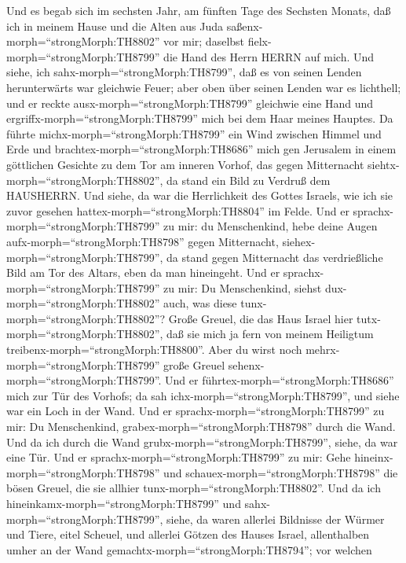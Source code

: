  Und es begab sich im sechsten Jahr, am fünften Tage des
Sechsten Monats, daß ich in meinem Hause und die Alten aus Juda
saßenx-morph=``strongMorph:TH8802'' vor mir; daselbst
fielx-morph=``strongMorph:TH8799'' die Hand des Herrn HERRN auf mich.
 Und siehe, ich sahx-morph=``strongMorph:TH8799'', daß es
von seinen Lenden herunterwärts war gleichwie Feuer; aber oben über
seinen Lenden war es lichthell;  und er reckte
ausx-morph=``strongMorph:TH8799'' gleichwie eine Hand und
ergriffx-morph=``strongMorph:TH8799'' mich bei dem Haar meines Hauptes.
Da führte michx-morph=``strongMorph:TH8799'' ein Wind zwischen Himmel
und Erde und brachtex-morph=``strongMorph:TH8686'' mich gen Jerusalem in
einem göttlichen Gesichte zu dem Tor am inneren Vorhof, das gegen
Mitternacht siehtx-morph=``strongMorph:TH8802'', da stand ein Bild zu
Verdruß dem HAUSHERRN.  Und siehe, da war die Herrlichkeit
des Gottes Israels, wie ich sie zuvor gesehen
hattex-morph=``strongMorph:TH8804'' im Felde.  Und er
sprachx-morph=``strongMorph:TH8799'' zu mir: du Menschenkind, hebe deine
Augen aufx-morph=``strongMorph:TH8798'' gegen Mitternacht,
siehex-morph=``strongMorph:TH8799'', da stand gegen Mitternacht das
verdrießliche Bild am Tor des Altars, eben da man hineingeht.
 Und er sprachx-morph=``strongMorph:TH8799'' zu mir: Du
Menschenkind, siehst dux-morph=``strongMorph:TH8802'' auch, was diese
tunx-morph=``strongMorph:TH8802''? Große Greuel, die das Haus Israel
hier tutx-morph=``strongMorph:TH8802'', daß sie mich ja fern von meinem
Heiligtum treibenx-morph=``strongMorph:TH8800''. Aber du wirst noch
mehrx-morph=``strongMorph:TH8799'' große Greuel
sehenx-morph=``strongMorph:TH8799''.  Und er
führtex-morph=``strongMorph:TH8686'' mich zur Tür des Vorhofs; da sah
ichx-morph=``strongMorph:TH8799'', und siehe war ein Loch in der Wand.
 Und er sprachx-morph=``strongMorph:TH8799'' zu mir: Du
Menschenkind, grabex-morph=``strongMorph:TH8798'' durch die Wand. Und da
ich durch die Wand grubx-morph=``strongMorph:TH8799'', siehe, da war
eine Tür.  Und er sprachx-morph=``strongMorph:TH8799'' zu
mir: Gehe hineinx-morph=``strongMorph:TH8798'' und
schauex-morph=``strongMorph:TH8798'' die bösen Greuel, die sie allhier
tunx-morph=``strongMorph:TH8802''.  Und da ich
hineinkamx-morph=``strongMorph:TH8799'' und
sahx-morph=``strongMorph:TH8799'', siehe, da waren allerlei Bildnisse
der Würmer und Tiere, eitel Scheuel, und allerlei Götzen des Hauses
Israel, allenthalben umher an der Wand
gemachtx-morph=``strongMorph:TH8794'';  vor welchen
